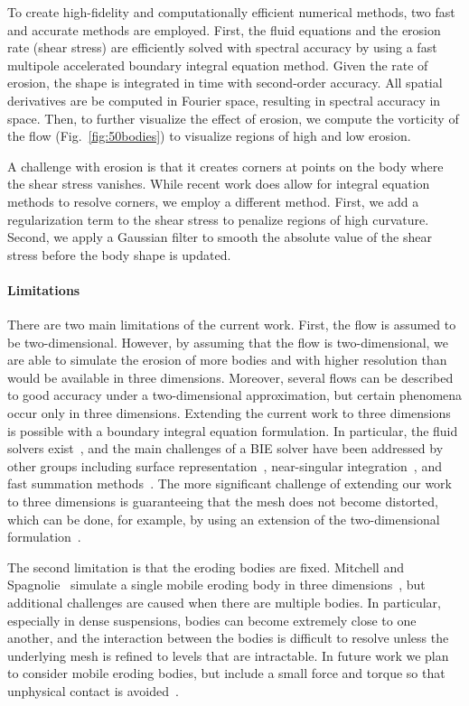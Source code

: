 \documentclass[preprint, 10pt]{elsarticle}
\begin{document}
To create high-fidelity and computationally efficient numerical methods,
two fast and accurate methods are employed.  First, the fluid equations
and the erosion rate (shear stress) are efficiently solved with spectral
accuracy by using a fast multipole accelerated boundary integral
equation method.  Given the rate of erosion, the shape is integrated in
time with second-order accuracy.  All spatial derivatives are be
computed in Fourier space, resulting in spectral accuracy in space.
Then, to further visualize the effect of erosion, we compute the
vorticity of the flow (Fig.~\ref{fig:50bodies}) to visualize regions
of high and low erosion.

A challenge with erosion is that it creates corners at points on the
body where the shear stress vanishes.  While recent work does allow for
integral equation methods to resolve corners, we employ a different
method.  First, we add a regularization term to the shear stress to
penalize regions of high curvature.  Second, we apply a Gaussian filter
to smooth the absolute value of the shear stress before the body shape
is updated.

\paragraph{Limitations} There are two main limitations of the current
work.  First, the flow is assumed to be two-dimensional.  However, by
assuming that the flow is two-dimensional, we are able to simulate the
erosion of more bodies and with higher resolution than would be
available in three dimensions.  Moreover, several flows can be described
to good accuracy under a two-dimensional approximation, but certain
phenomena occur only in three dimensions.  Extending the current work to
three dimensions is possible with a boundary integral equation
formulation.  In particular, the fluid solvers exist~\cite{mal-bir2015},
and the main challenges of a BIE solver have been addressed by other
groups including surface representation~\cite{yin-bir-zor2006,
vee-rah-bir-zor2011}, near-singular integration~\cite{yin-bir-zor2006,
kli-tor2016b}, and fast summation methods~\cite{yin-bir-zor2004,
ros-ols2015}.  The more significant challenge of extending our work to
three dimensions is guaranteeing that the mesh does not become
distorted, which can be done, for example, by using an extension of the
two-dimensional {\thL} formulation~\cite{amb-sie-tlu2013}.

The second limitation is that the eroding bodies are fixed.  Mitchell
and Spagnolie~\cite{mit-spa2016} simulate a single mobile eroding body
in three dimensions~\cite{mit-spa2016}, but additional challenges are
caused when there are multiple bodies. In particular, especially in
dense suspensions, bodies can become extremely close to one another, and
the interaction between the bodies is difficult to resolve unless the
underlying mesh is refined to levels that are intractable. In future
work we plan to consider mobile eroding bodies, but include a small
force and torque so that unphysical contact is
avoided~\cite{lu-rah-zor2017}.
\end{document}
